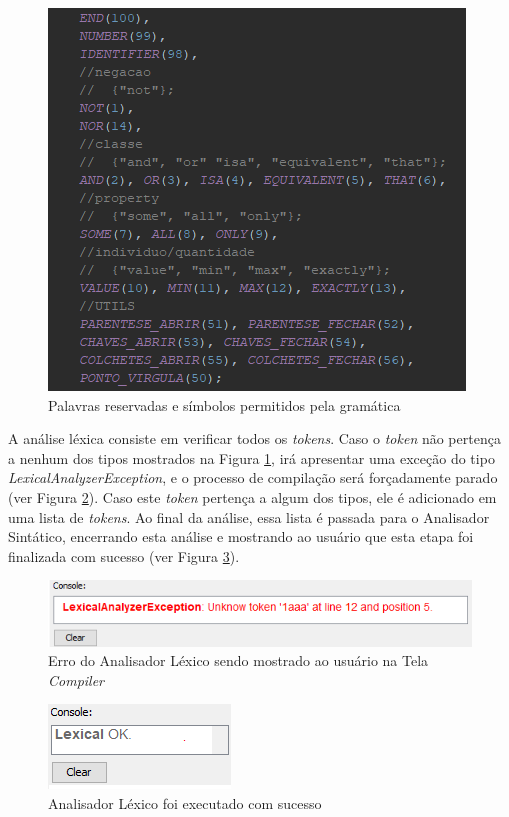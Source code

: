 \documentclass{bcc}
\begin{document}
\begin{figure}[H]
\centering
\includegraphics[width=.7\textwidth]{Figuras/codigo_tokenenum.png}
\caption{Palavras reservadas e símbolos permitidos pela gramática}
\label{fig:codigoTokenenum}
\end{figure}

A análise léxica consiste em verificar todos os \textit{tokens}. Caso o \textit{token} não pertença a nenhum dos tipos mostrados na Figura \ref{fig:codigoTokenenum}, irá apresentar uma exceção do tipo \textit{LexicalAnalyzerException}, e o processo de compilação será forçadamente parado (ver Figura \ref{fig:codigoErroLexico}). Caso este \textit{token} pertença a algum dos tipos, ele é adicionado em uma lista de \textit{tokens}. Ao final da análise, essa lista é passada para o Analisador Sintático, encerrando esta análise e mostrando ao usuário que esta etapa foi finalizada com sucesso (ver Figura \ref{fig:codigoSucessoLexico}).

\begin{figure}[H]
\centering
\includegraphics[width=.7\textwidth]{Figuras/codigo_erro_lexico.png}
\caption{Erro do Analisador Léxico sendo mostrado ao usuário na Tela \textit{Compiler}}
\label{fig:codigoErroLexico}
\end{figure}

\begin{figure}[H]
\centering
\includegraphics[width=.3\textwidth]{Figuras/codigo_sucesso_lexico.png}
\caption{Analisador Léxico foi executado com sucesso}
\label{fig:codigoSucessoLexico}
\end{figure}
\end{document}
